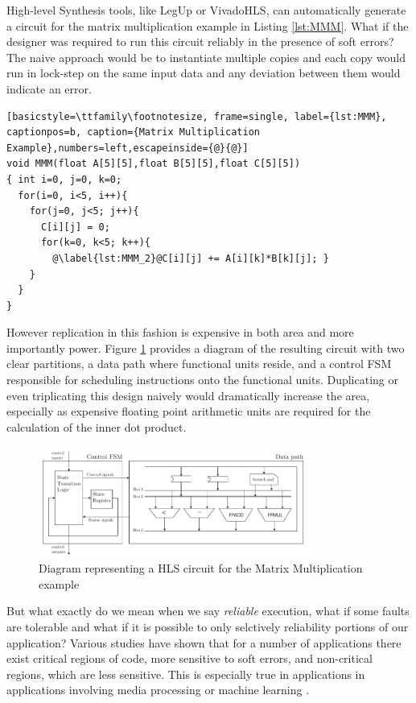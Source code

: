 \providecommand*{\lstnumberautorefname}{line}

High-level Synthesis tools, like LegUp or VivadoHLS, can automatically generate a circuit
for the matrix multiplication example in Listing \ref{lst:MMM}.
What if the designer was required to run this circuit reliably in the
presence of soft errors? 
The naive approach would be to instantiate multiple copies and each copy would run in lock-step
on the same input data and any deviation between them would indicate an error.

\lstset{language=C}
\begin{lstlisting}[basicstyle=\ttfamily\footnotesize, frame=single, label={lst:MMM}, captionpos=b, caption={Matrix Multiplication Example},numbers=left,escapeinside={@}{@}]
void MMM(float A[5][5],float B[5][5],float C[5][5])
{ int i=0, j=0, k=0;
  for(i=0, i<5, i++){
    for(j=0, j<5; j++){
      C[i][j] = 0;
      for(k=0, k<5; k++){
        @\label{lst:MMM_2}@C[i][j] += A[i][k]*B[k][j]; }
    }
  }
}
\end{lstlisting}

However replication in this fashion is expensive in both area and more importantly
power. 
Figure \ref{fig:singleHLSArch} provides a diagram of the resulting
circuit with two clear partitions, a data path where functional units reside, and a
control FSM responsible for scheduling instructions onto the functional units. 
Duplicating or even triplicating this design naively would dramatically increase the
area, especially as expensive floating point arithmetic units are required for the
calculation of the inner dot product. 

\begin{figure}[h]
\centering
\includegraphics[width=3.5in]{./imgs/singleHLSArch.pdf}
\caption{Diagram representing a HLS circuit for the Matrix Multiplication example}
\label{fig:singleHLSArch}
\end{figure}

But what exactly do we mean when we say \emph{reliable} execution, what if some faults
are tolerable and what if it is possible to only selctively reliability portions of our application?
Various studies have shown that for a number of applications there exist critical regions
of code, more sensitive to soft errors, and non-critical regions, which are less sensitive.  
This is especially true in applications in applications involving media processing or machine
learning\cite{wong2006soft} \cite{liu2012flikker}.

